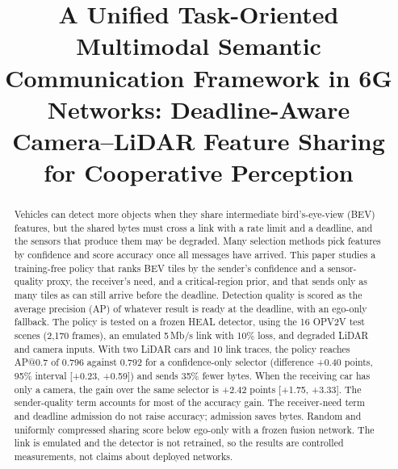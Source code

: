 \documentclass[conference]{IEEEtran}
\begin{document}
\title{A Unified Task-Oriented Multimodal Semantic Communication Framework in 6G Networks: Deadline-Aware Camera--LiDAR Feature Sharing for Cooperative Perception}

\author{
\and
{}
}

\maketitle

\begin{abstract}
Vehicles can detect more objects when they share intermediate bird's-eye-view (BEV) features, but the shared bytes must cross a link with a rate limit and a deadline, and the sensors that produce them may be degraded. Many selection methods pick features by confidence and score accuracy once all messages have arrived. This paper studies a training-free policy that ranks BEV tiles by the sender's confidence and a sensor-quality proxy, the receiver's need, and a critical-region prior, and that sends only as many tiles as can still arrive before the deadline. Detection quality is scored as the average precision (AP) of whatever result is ready at the deadline, with an ego-only fallback. The policy is tested on a frozen HEAL detector, using the 16 OPV2V test scenes (2,170 frames), an emulated 5\,Mb/s link with 10\% loss, and degraded LiDAR and camera inputs. With two LiDAR cars and 10 link traces, the policy reaches AP@0.7 of 0.796 against 0.792 for a confidence-only selector (difference +0.40 points, 95\% interval [+0.23, +0.59]) and sends 35\% fewer bytes. When the receiving car has only a camera, the gain over the same selector is +2.42 points [+1.75, +3.33]. The sender-quality term accounts for most of the accuracy gain. The receiver-need term and deadline admission do not raise accuracy; admission saves bytes. Random and uniformly compressed sharing score below ego-only with a frozen fusion network. The link is emulated and the detector is not retrained, so the results are controlled measurements, not claims about deployed networks.
\end{abstract}
\end{document}
